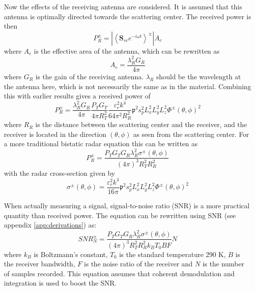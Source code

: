 \documentclass[11pt,twoside]{eitExjobb}
\begin{document}
	Now the effects of the receiving antenna are considered. It is assumed that this antenna is optimally directed towards the scattering center. The received power is then
	\begin{equation*}
		P_R^\pm = \left| \left< \bm{S}_{sc} e^{-i\omega t} \right>^\pm \right| A_e
	\end{equation*}
	where $A_e$ is the effective area of the antenna, which can be rewritten as
	\begin{equation*}
		A_e = \frac{\lambda_R^2 G_R}{4\pi}
	\end{equation*}
	where $G_R$ is the gain of the receiving antenna. $\lambda_R$ should be the wavelength at the antenna here, which is not necessarily the same as in the material. Combining this with earlier results gives a received power of
	\begin{equation*}
		P_R^\pm = \frac{\lambda_R^2 G_R}{4\pi} \frac{P_T G_T}{4\pi R_T^2} \frac{\varepsilon_r^2 k^4}{64 \pi^2 R_R^2} \mathfrak{p}^2 s_p^2 L_x^2 L_y^2 L_z^2 \Phi^\pm (\theta,\phi)^2
	\end{equation*}
	where $R_R$ is the distance between the scattering center and the receiver, and the receiver is located in the direction $(\theta,\phi)$ as seen from the scattering center. For a more traditional bistatic radar equation this can be written as
	\begin{equation*}
		P_R^\pm = \frac{P_T G_T G_R \lambda_R^2 \sigma^\pm (\theta,\phi)}{(4\pi)^3 R_T^2 R_R^2}
	\end{equation*}
	with the radar cross-section given by
	\begin{equation*}
		\sigma^\pm (\theta, \phi) = \frac{\varepsilon_r^2 k^4}{16\pi} \mathfrak{p}^2 s_p^2 L_x^2 L_y^2 L_z^2 \Phi^\pm (\theta,\phi)^2
	\end{equation*}
	
	When actually measuring a signal, signal-to-noise ratio (SNR) is a more practical quantity than received power. The equation can be rewritten using SNR (see appendix \ref{app:derivations}) as:
	\begin{equation*}
		\textit{SNR}^\pm_N = \frac{P_T G_T G_R \lambda_R^2 \sigma^\pm (\theta,\phi)}{(4\pi)^3 R_T^2 R_R^2 k_B T_0 B F} N
	\end{equation*}
	where $k_B$ is Boltzmann's constant, $T_0$ is the standard temperature 290 K, $B$ is the receiver bandwidth, $F$ is the noise ratio of the receiver and $N$ is the number of samples recorded. This equation assumes that coherent demodulation and integration is used to boost the SNR.
	
\end{document}
